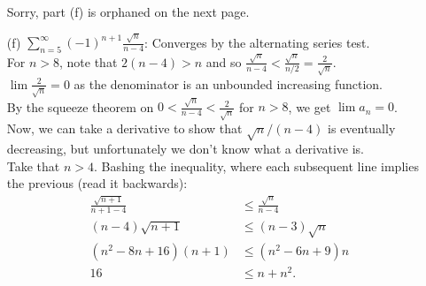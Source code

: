 \documentclass{article}
\begin{document}
\begin{enumerate}
    Sorry, part (f) is orphaned on the next page.
    \newpage{}
    \item[(f)] $\sum\limits_{n=5}^\infty (-1)^{n+1}\frac{\sqrt n}{n-4}$: Converges by the alternating series test.  \\ For $n > 8$, note that $2(n-4) > n$ and so $\frac{\sqrt{n}}{n-4}< \frac{\sqrt{n}}{n/2} = \frac{2}{\sqrt{n}}$. \\ $\lim \frac{2}{\sqrt{n}} = 0$ as the denominator is an unbounded increasing function. \\ By the squeeze theorem on $0 < \frac{\sqrt{n}}{n-4} < \frac{2}{\sqrt{n}}$ for $n>8$, we get $\lim a_n = 0$. \\ 
    Now, we can take a derivative to show that $\sqrt{n}/(n-4)$ is eventually decreasing, but unfortunately we don't know what a derivative is. \\
    Take that $n>4$. 
    Bashing the inequality, where each subsequent line implies the previous (read it backwards):
    \begin{align*}
        \frac{\sqrt{n+1}}{n+1-4} &\le \frac{\sqrt n}{n-4} \\
        (n-4) \sqrt{n+1}&\le (n-3)\sqrt {n} \\
        (n^2-8n+16)(n+1) &\le (n^2-6n+9)n \\
        16&\le n+n^2.
    \end{align*}
    
\end{enumerate}
\end{document}
